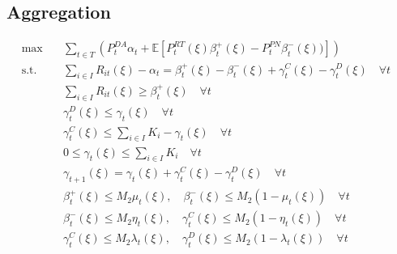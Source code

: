 \documentclass[10pt]{article}
\begin{document}
\subsection{Aggregation}
\begin{subequations}
    \begin{align}
    \text{max} \quad &\sum_{t\in T}\left(P_t^{DA}\alpha_t + \mathbb{E}\left[P_t^{RT}(\xi)\beta_{t}^{+}(\xi) - P_t^{PN}\beta_{t}^{-}(\xi))\right]\right)&\\   
    \text{s.t.} \quad & \sum_{i \in I} R_{it}(\xi) - \alpha_t = \beta^+_t(\xi) - \beta^-_t(\xi) + \gamma^C_t(\xi) - \gamma^D_t(\xi) \quad \forall t &\\
    &\sum_{i\in I}R_{it}(\xi) \geq \beta_{t}^{+}(\xi) \quad \forall t &\\ 
    &\gamma^D_t(\xi) \le \gamma_{t}(\xi) \quad \forall t &\\
    &\gamma^C_t(\xi) \le \sum_{i \in I}K_i - \gamma_{t}(\xi) \quad \forall t &\\
    &0 \leq \gamma_t(\xi) \leq \sum_{i \in I} K_i \quad \forall t &\\
    &\gamma_{t+1}(\xi) = \gamma_{t}(\xi) + \gamma^C_t(\xi) - \gamma^D_t(\xi) \quad \forall t &\\
    &\beta^+_t(\xi) \le M_2 \mu_t(\xi), \quad \beta^-_t(\xi) \le M_2 (1 - \mu_t(\xi)) \quad \forall t &\\ 
    &\beta^-_t(\xi) \le M_2 \eta_t(\xi), \quad \gamma^C_t(\xi) \le M_2 (1 - \eta_t(\xi)) \quad \forall t &\\
    &\gamma^C_t(\xi) \le M_2\lambda_t(\xi), \quad \gamma^D_t(\xi) \le M_2(1 - \lambda_t(\xi)) \quad \forall t &
    \end{align}
\end{subequations}

\newpage
\end{document}
